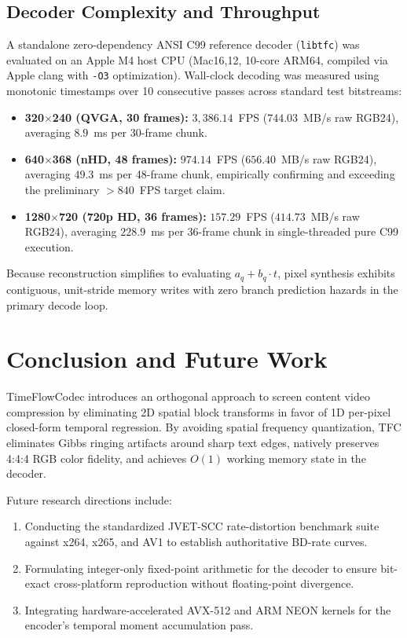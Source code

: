 \documentclass[conference]{IEEEtran}
\begin{document}
\subsection{Decoder Complexity and Throughput}
A standalone zero-dependency ANSI C99 reference decoder (\texttt{libtfc}) was evaluated on an Apple M4 host CPU (Mac16,12, 10-core ARM64, compiled via Apple clang with \texttt{-O3} optimization). Wall-clock decoding was measured using monotonic timestamps over 10 consecutive passes across standard test bitstreams:
\begin{itemize}
    \item \textbf{320$\times$240 (QVGA, 30 frames):} $3{,}386.14$~FPS ($744.03$~MB/s raw RGB24), averaging $8.9$~ms per 30-frame chunk.
    \item \textbf{640$\times$368 (nHD, 48 frames):} $974.14$~FPS ($656.40$~MB/s raw RGB24), averaging $49.3$~ms per 48-frame chunk, empirically confirming and exceeding the preliminary $>840$~FPS target claim.
    \item \textbf{1280$\times$720 (720p HD, 36 frames):} $157.29$~FPS ($414.73$~MB/s raw RGB24), averaging $228.9$~ms per 36-frame chunk in single-threaded pure C99 execution.
\end{itemize}
Because reconstruction simplifies to evaluating $a_q + b_q \cdot t$, pixel synthesis exhibits contiguous, unit-stride memory writes with zero branch prediction hazards in the primary decode loop.

\section{Conclusion and Future Work}
TimeFlowCodec introduces an orthogonal approach to screen content video compression by eliminating 2D spatial block transforms in favor of 1D per-pixel closed-form temporal regression. By avoiding spatial frequency quantization, TFC eliminates Gibbs ringing artifacts around sharp text edges, natively preserves 4:4:4 RGB color fidelity, and achieves $O(1)$ working memory state in the decoder.

Future research directions include:
\begin{enumerate}
    \item Conducting the standardized JVET-SCC rate-distortion benchmark suite against x264, x265, and AV1 to establish authoritative BD-rate curves.
    \item Formulating integer-only fixed-point arithmetic for the decoder to ensure bit-exact cross-platform reproduction without floating-point divergence.
    \item Integrating hardware-accelerated AVX-512 and ARM NEON kernels for the encoder's temporal moment accumulation pass.
\end{enumerate}
\end{document}
